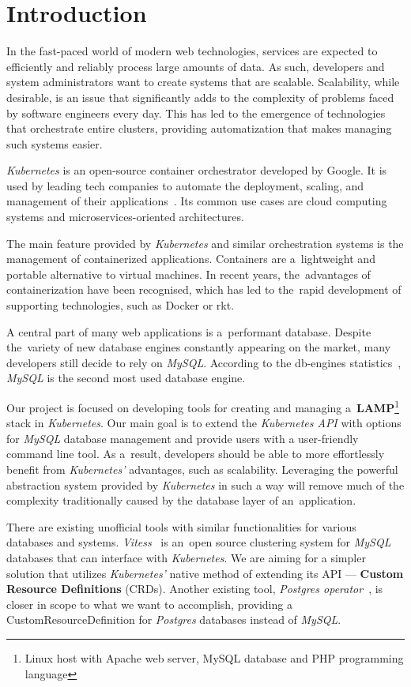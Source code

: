 \chapter{Introduction}
In the fast-paced world of modern web technologies, services are expected to
efficiently and reliably process large amounts of data. As such, developers
and system administrators want to create systems that are scalable. Scalability,
while desirable, is an issue that significantly adds to the complexity of
problems faced by software engineers every day. This has led to the emergence of
technologies that orchestrate entire clusters, providing automatization that
makes managing such systems easier.

\textit{Kubernetes} is an open-source container orchestrator developed by
Google. It is used by leading tech companies to automate the deployment,
scaling, and management of their applications~\cite{kube-usecase}. Its common
use cases are cloud computing systems and microservices-oriented architectures.

The main feature provided by \textit{Kubernetes} and similar orchestration
systems is the management of containerized applications. Containers are
a~lightweight and portable alternative to virtual machines. In recent years,
the~advantages of containerization have been recognised, which has led to
the~rapid development of supporting technologies, such as Docker or rkt.

A central part of many web applications is a~performant database. Despite
the~variety of new database engines constantly appearing on the market, many
developers still decide to rely on \textit{MySQL}. According to the db-engines
statistics~\cite{db-eng}, \textit{MySQL} is the second most used database
engine.

Our project is focused on developing tools for creating and managing
a~\textbf{LAMP}\footnote{Linux host with Apache web server, MySQL database
and PHP programming language} stack in \textit{Kubernetes}. Our main goal is to
extend the \textit{Kubernetes API} with options for \textit{MySQL} database
management and provide users with a user-friendly command line tool. As
a~result, developers should be able to more effortlessly benefit from
\textit{Kubernetes’} advantages, such as scalability. Leveraging the powerful
abstraction system provided by \textit{Kubernetes} in such a way will remove
much of the complexity traditionally caused by the database layer of
an~application.

There are existing unofficial tools with similar functionalities for various
databases and systems. \textit{Vitess}~\cite{vitess} is an~open source
clustering system for \textit{MySQL} databases that can interface with
\textit{Kubernetes}. We are aiming for a simpler solution that utilizes
\textit{Kubernetes'} native method of extending its API ---
\textbf{Custom Resource Definitions} (CRDs). Another existing tool,
\textit{Postgres operator}~\cite{psql-op}, is closer in scope to what we want to
accomplish, providing a CustomResourceDefinition for \textit{Postgres} 
databases instead of \textit{MySQL}.

